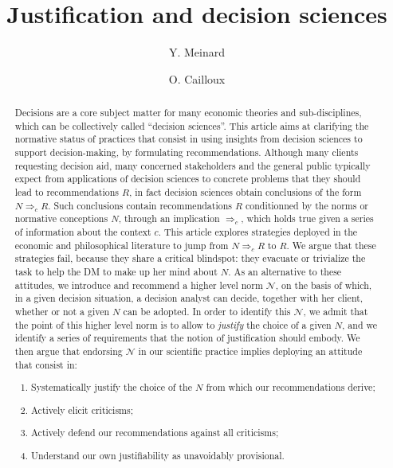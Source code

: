 \documentclass[preprint, french, english, 11pt, authoryear]{elsarticle}%
\newcommand{\adv}{\mathscr{N}}
\begin{document}
\title{Justification and decision sciences}

\author[ld]{Y. Meinard}
\author[ld]{O. Cailloux}
\address[ld]{Universit\'e Paris-Dauphine, PSL Research University, CNRS, UMR [7243], LAMSADE, 75016 PARIS, FRANCE}

\begin{abstract}
Decisions are a core subject matter for many economic theories and sub-disciplines, which can be collectively called “decision sciences”. This article aims at clarifying the normative status of practices that consist in using insights from decision sciences to support decision-making, by formulating recommendations. Although many clients requesting decision aid, many concerned stakeholders and the general public typically expect from applications of decision sciences to concrete problems that they should lead to recommendations $R$, in fact decision sciences obtain conclusions of the form $N ⇒_c R$. Such conclusions contain recommendations $R$ conditionned by the norms or normative conceptions $N$, through  an implication $⇒_c$, which holds true given a series of information about the context $c$. This article explores strategies deployed in the economic and philosophical literature to jump from $N ⇒_c R$ to $R$. We argue that these strategies fail, because they share a critical blindspot: they evacuate or trivialize the task to help the \ac{DM} to make up her mind about $N$. As an alternative to these attitudes, we introduce and recommend a higher level norm $\adv$, on the basis of which, in a given decision situation, a decision analyst can decide, together with her client, whether or not a given $N$ can be adopted. In order to identify this $\adv$, we admit that the point of this higher level norm is to allow to \emph{justify} the choice of a given $N$, and we identify a series of requirements that the notion of justification should embody. We then argue that endorsing $\adv$ in our scientific practice implies deploying an attitude that consist in:
\begin{enumerate}[label=\roman*.]
	\item Systematically justify the choice of the $N$ from which our recommendations derive;
	\item Actively elicit criticisms;
	\item Actively defend our recommendations against all criticisms;
	\item Understand our own justifiability as unavoidably provisional.
\end{enumerate}
\end{abstract}
\end{document}
